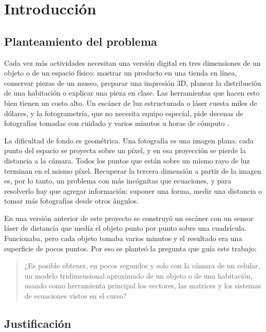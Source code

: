 \section{Introducción}

\subsection{Planteamiento del problema}

Cada vez más actividades necesitan una versión digital en tres dimensiones de
un objeto o de un espacio físico: mostrar un producto en una tienda en línea,
conservar piezas de un museo, preparar una impresión 3D, planear la
distribución de una habitación o explicar una pieza en clase. Las
herramientas que hacen esto bien tienen un costo alto. Un escáner de luz
estructurada o láser cuesta miles de dólares, y la fotogrametría, que no
necesita equipo especial, pide decenas de fotografías tomadas con cuidado y
varios minutos u horas de cómputo \citep{szeliski2022}.

La dificultad de fondo es geométrica. Una fotografía es una imagen plana: cada
punto del espacio se proyecta sobre un píxel, y en esa proyección se pierde la
distancia a la cámara. Todos los puntos que están sobre un mismo rayo de luz
terminan en el mismo píxel. Recuperar la tercera dimensión a partir de la
imagen es, por lo tanto, un problema con más incógnitas que ecuaciones, y para
resolverlo hay que agregar información: suponer una forma, medir una
distancia o tomar más fotografías desde otros ángulos.

En una versión anterior de este proyecto se construyó un escáner con un
sensor láser de distancia que medía el objeto punto por punto sobre una
cuadrícula. Funcionaba, pero cada objeto tomaba varios minutos y el resultado
era una superficie de pocos puntos. Por eso se planteó la pregunta que guía
este trabajo:

\begin{quote}
¿Es posible obtener, en pocos segundos y solo con la cámara de un celular, un
modelo tridimensional aproximado de un objeto o de una habitación, usando como herramienta
principal los vectores, las matrices y los sistemas de ecuaciones vistos en el
curso?
\end{quote}

\subsection{Justificación}

